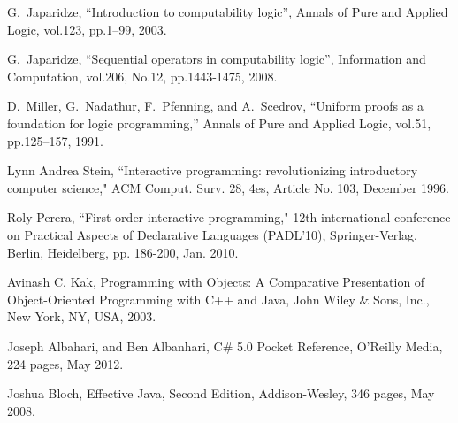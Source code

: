 \documentclass[letter]{ieice}
\begin{document}
\begin{thebibliography}{1}


G.~Japaridze, ``Introduction to computability logic'', Annals  of Pure and
 Applied  Logic, vol.123, pp.1--99, 2003.

G.~Japaridze,   ``Sequential operators in computability logic'',
 Information and Computation, vol.206, No.12, pp.1443-1475, 2008.

D.~Miller, G.~Nadathur, F.~Pfenning, and A.~Scedrov, ``Uniform proofs as a
  foundation for logic programming,'' Annals of Pure and Applied Logic, vol.51,
  pp.125--157, 1991.

Lynn Andrea Stein, ``Interactive programming: revolutionizing introductory computer science," ACM Comput. Surv. 28, 4es, Article No. 103, December 1996.

Roly Perera, ``First-order interactive programming," 12th international conference on Practical Aspects of Declarative Languages (PADL'10),
Springer-Verlag, Berlin, Heidelberg, pp. 186-200, Jan. 2010.

Avinash C. Kak, Programming with Objects: A Comparative Presentation of Object-Oriented Programming with C++ and Java,
John Wiley \& Sons, Inc., New York, NY, USA, 2003.

Joseph Albahari, and Ben Albanhari, C\# 5.0 Pocket Reference, O'Reilly Media, 224 pages, May 2012.

Joshua Bloch, Effective Java, Second Edition, Addison-Wesley, 346 pages, May 2008.

\end{thebibliography}
\end{document}
